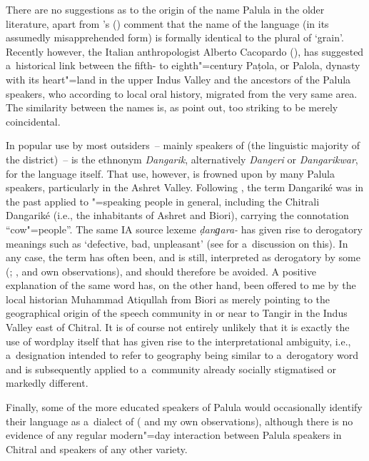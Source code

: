 \largerpage
There are no suggestions as to the origin of the name Palula in the older literature, apart from \citeauthor{morgenstierne1941}'s (\citeyear[53]{morgenstierne1941}) comment that the name of the language (in its assumedly misapprehended form) is formally identical to the plural of `grain'. Recently however, the Italian anthropologist Alberto Cacopardo (\citeyear[91]{cacopardo2001}), has suggested a~historical link between the fifth- to eighth"=century Paṭola, or Palola, dynasty with its heart"=land in the upper Indus Valley and the ancestors of the Palula speakers, who according to local oral history, migrated from the very same area. The similarity between the names is, as \citet[3]{schmidtkohistani2008} point out, too striking to be merely coincidental.


In popular use by most outsiders~-- mainly speakers of \iliKhowar (the linguistic majority of the district)~-- is the ethnonym \textit{Dangarik},
alternatively \textit{Dangeri} or \textit{Dangarikwar}, for the language itself. That use, however,
is frowned upon by many Palula speakers, particularly in the Ashret Valley. Following
\citet[113]{biddulph1986}, the term Dangariké was in the past applied to \iliShina"=speaking people in general, including the Chitrali Dangariké (i.e., the inhabitants of Ashret and Biori), carrying the
connotation ``cow"=people''. The same IA source lexeme \textit{ḍanɡara-}
\citep[5526, 5524]{turner1966} has given rise to derogatory meanings such as `defective, bad,
unpleasant' (see \citealt[81]{cacopardo2001} for a~discussion on this). In any case, the term has
often been, and is still, interpreted as derogatory by some (\citealt[69]{decker1992a};
\citeyear[160]{decker1996}, and own observations), and should therefore be avoided. A positive
explanation of the same word has, on the other hand, been offered to me by the local historian Muhammad Atiqullah from Biori as merely pointing to the geographical origin of the speech community in or near to
Tangir in the Indus Valley east of Chitral. It is of course not entirely unlikely that it is exactly
the use of wordplay itself that has given rise to the interpretational ambiguity, i.e., a~designation
intended to refer to geography being similar to a~derogatory word and is subsequently applied to
a~community already socially stigmatised or markedly different.


Finally, some of the more educated speakers of Palula would occasionally identify their language as a~dialect of \iliShina (\citealt[82]{decker1992a} and my own observations), although there is no evidence of any regular modern"=day interaction between Palula speakers in Chitral and speakers of any other \iliShina variety. 

